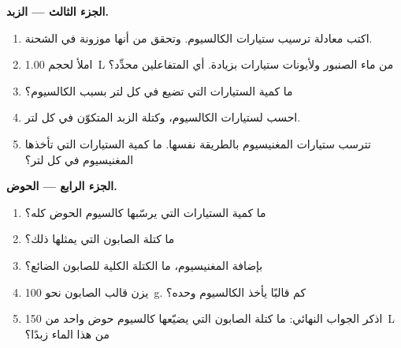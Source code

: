 \begin{problem}
\medskip
\noindent\textbf{الجزء الثالث --- الزبد.}
\begin{enumerate}[resume]
  \item اكتب معادلة ترسيب ستيارات الكالسيوم.
        وتحقق من أنها موزونة في الشحنة.
  \item املأ  لحجم \qty{1.00}{L} من ماء الصنبور
        ولأيونات ستيارات بزيادة. أي المتفاعلين محدِّد؟
  \item ما كمية  الستيارات التي تضيع في كل لتر بسبب الكالسيوم؟
  \item احسب  لستيارات الكالسيوم، وكتلة الزبد
        المتكوّن في كل لتر.
  \item تترسب ستيارات المغنيسيوم بالطريقة نفسها. ما كمية
        الستيارات التي تأخذها  المغنيسيوم في كل لتر؟
\end{enumerate}

\medskip
\noindent\textbf{الجزء الرابع --- الحوض.}
\begin{enumerate}[resume]
  \item ما كمية  الستيارات التي يرسّبها كالسيوم الحوض
        كله؟
  \item ما كتلة الصابون التي يمثلها ذلك؟
  \item بإضافة المغنيسيوم، ما الكتلة الكلية للصابون الضائع؟
  \item يزن قالب الصابون نحو \qty{100}{g}. كم قالبًا يأخذ
        الكالسيوم وحده؟
  \item اذكر الجواب النهائي: ما كتلة الصابون التي يضيّعها كالسيوم حوض واحد
        من \qty{150}{L} من هذا الماء زبدًا؟
\end{enumerate}
\end{problem}
